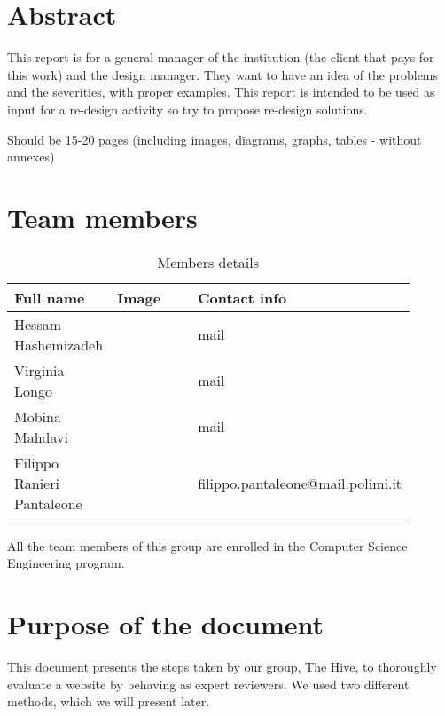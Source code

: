 \section{Abstract}
This report is for a general manager of the institution (the client that pays for this work) and the design manager. They want to have an idea of the problems and the severities, with proper examples.
This report is intended to be used as input for a re-design activity so try to propose re-design solutions.

Should be 15-20 pages (including images, diagrams, graphs, tables - without annexes)


\section{Team members}
\begin{longtable}
    {|m{0.2\linewidth}|m{0.2\linewidth}|m{0.5\linewidth}|}
            \hline
            \textbf{Full name} & \textbf{Image} & \textbf{Contact info}\\
            \hline
            \endhead
                Hessam Hashemizadeh &
                \centering
                & mail \\
            \hline
                Virginia Longo  &
                \centering
                & mail \\
            \hline
                Mobina Mahdavi &
                \centering
                & mail \\
            \hline
                Filippo Ranieri Pantaleone &
                \centering
                & filippo.pantaleone@mail.polimi.it \\
            \hline
            \caption{Members details}
            \label{table:mem_details}
\end{longtable}

All the team members of this group are enrolled in the Computer Science Engineering program.

\section{Purpose of the document}
This document presents the steps taken by our group, The Hive, to thoroughly evaluate a website by behaving as expert reviewers. We used two different methods, which we will present later.


